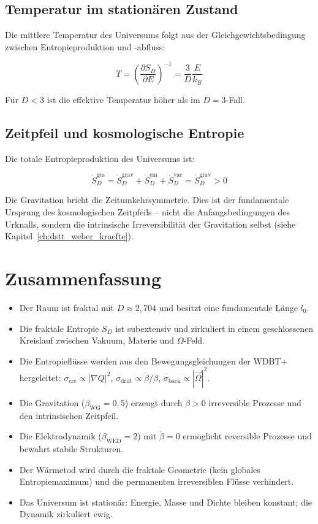 \subsection{Temperatur im stationären Zustand}
\label{sub:fraktale_entropie_temperatur}

Die mittlere Temperatur des Universums folgt aus der Gleichgewichtsbedingung zwischen 
Entropieproduktion und -abfluss:

\[
T = \left( \frac{\partial S_D}{\partial E} \right)^{-1} = \frac{3}{D} \frac{E}{k_B} \tag{L.19}
\]

Für $D < 3$ ist die effektive Temperatur höher als im $D = 3$-Fall.

\subsection{Zeitpfeil und kosmologische Entropie}
\label{sub:fraktale_entropie_zeitpfeil}

Die totale Entropieproduktion des Universums ist:

\[
\dot{S}_D^{\text{ges}} = \dot{S}_D^{\text{grav}} + \dot{S}_D^{\text{em}} + \dot{S}_D^{\text{vac}} = \dot{S}_D^{\text{grav}} > 0 \tag{L.20}
\]

Die Gravitation bricht die Zeitumkehrsymmetrie. Dies ist der fundamentale Ursprung 
des kosmologischen Zeitpfeils – nicht die Anfangsbedingungen des Urknalls, sondern 
die intrinsische Irreversibilität der Gravitation selbst (siehe Kapitel~\ref{ch:dstt_weber_kraefte}).

\section{Zusammenfassung}
\label{app:fraktale_entropie_zusammenfassung}

\begin{itemize}
    \item Der Raum ist fraktal mit $D \approx 2,704$ und besitzt eine fundamentale Länge $l_0$.
    \item Die fraktale Entropie $S_D$ ist subextensiv und zirkuliert in einem geschlossenen 
          Kreislauf zwischen Vakuum, Materie und $\Omega$-Feld.
    \item Die Entropieflüsse werden aus den Bewegungsgleichungen der WDBT+ hergeleitet:
          $\sigma_{\text{cre}} \propto |\nabla Q|^2$, 
          $\sigma_{\text{drift}} \propto \dot{\beta}/\beta$, 
          $\sigma_{\text{back}} \propto |\vec{\Omega}|^2$.
    \item Die Gravitation ($\beta_{\text{WG}} = 0,5$) erzeugt durch $\dot{\beta} > 0$ 
          irreversible Prozesse und den intrinsischen Zeitpfeil.
    \item Die Elektrodynamik ($\beta_{\text{WED}} = 2$) mit $\dot{\beta} = 0$ ermöglicht 
          reversible Prozesse und bewahrt stabile Strukturen.
    \item Der Wärmetod wird durch die fraktale Geometrie (kein globales Entropiemaximum) 
          und die permanenten irreversiblen Flüsse verhindert.
    \item Das Universum ist stationär: Energie, Masse und Dichte bleiben konstant; 
          die Dynamik zirkuliert ewig.
\end{itemize}